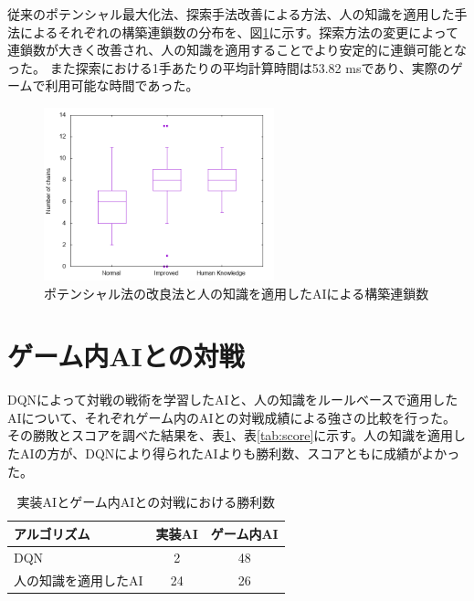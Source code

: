 \documentclass[twocolumn, a4paper]{UECIEresume}
\begin{document}
従来のポテンシャル最大化法、探索手法改善による方法、人の知識を適用した手法によるそれぞれの構築連鎖数の分布を、図\ref{fig:chain}に示す。探索方法の変更によって連鎖数が大きく改善され、人の知識を適用することでより安定的に連鎖可能となった。%
また探索における1手あたりの平均計算時間は53.82 msであり、実際のゲームで利用可能な時間であった。

\begin{figure}[htb]
  \begin{center}
  \includegraphics[height=5cm]{../graph/chain.png}
  \caption{ポテンシャル法の改良法と人の知識を適用したAIによる構築連鎖数} \label{fig:chain}
\end{center}
\end{figure}

\section{ゲーム内AIとの対戦}
DQNによって対戦の戦術を学習したAIと、人の知識をルールベースで適用したAIについて、それぞれゲーム内のAIとの対戦成績による強さの比較を行った。その勝敗とスコアを調べた結果を、表\ref{tab:win}、表\ref{tab:score}に示す。人の知識を適用したAIの方が、DQNにより得られたAIよりも勝利数、スコアともに成績がよかった。

%


\begin{table}[tbp]
\begin{center}
\caption{実装AIとゲーム内AIとの対戦における勝利数} \label{tab:win}
  \begin{tabular}{|l|c|c|} \hline
アルゴリズム & 実装AI & ゲーム内AI\\ \hline
DQN & 2 & 48\\ \hline
人の知識を適用したAI & 24 & 26\\ \hline
\end{tabular}
\end{center}
\end{table}
\end{document}
